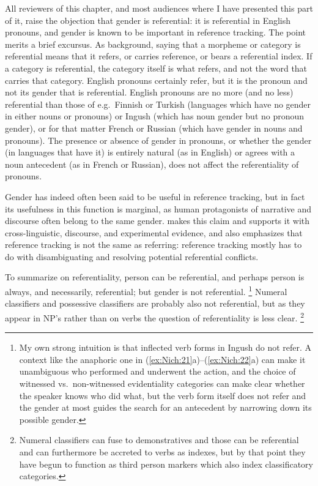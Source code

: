 \documentclass[output=collectionpaper]{langsci/langscibook}
\begin{document}
All reviewers of this chapter, and most audiences where I have presented this part of it, raise the objection that gender is referential: it is referential in English pronouns, and gender is known to be important in reference tracking. The point merits a brief excursus. As background, saying that a morpheme or category is referential means that it refers, or carries reference, or bears a referential index. If a category is referential, the category itself is what refers, and not the word that carries that category. English pronouns certainly refer, but it is the pronoun and not its gender that is referential. English pronouns are no more (and no less) referential than those of e.g.\ Finnish or Turkish (languages which have no gender in either nouns or pronouns) or Ingush (which has noun gender but no pronoun gender), or for that matter French or Russian (which have gender in nouns and pronouns). The presence or absence of gender in pronouns, or whether the gender (in languages that have it) is entirely natural (as in English) or agrees with a noun antecedent (as in French or Russian), does not affect the referentiality of pronouns.

Gender has indeed often been said to be useful in reference tracking, but in fact its usefulness in this function is marginal, as human protagonists of narrative and discourse often belong to the same gender. \citet[334--360]{Kibrik2011} makes this claim and supports it with cross-linguistic, discourse, and experimental evidence, and also emphasizes that reference tracking is not the same as referring: reference tracking mostly has to do with disambiguating and resolving potential referential conflicts.

To summarize on referentiality, person can be referential, and perhaps person is always, and necessarily, referential; but gender is not referential.%
\footnote{%
My own strong intuition is that inflected verb forms in Ingush do not refer. A context like the anaphoric one in (\ref{ex:Nich:21}a)--(\ref{ex:Nich:22}a) can make it unambiguous who performed and underwent the action, and the choice of witnessed vs.\ non-witnessed evidentiality categories can make clear whether the speaker knows who did what, but the verb form itself does not refer and the gender at most guides the search for an antecedent by narrowing down its possible gender.
} %
Numeral classifiers and possessive classifiers are probably also not referential, but as they appear in NP's rather than on verbs the question of referentiality is less clear.%
\footnote{%
Numeral classifiers can fuse to demonstratives and those can be referential and can furthermore be accreted to verbs as indexes, but by that point they have begun to function as third person markers which also index classificatory categories.
}%
\end{document}
